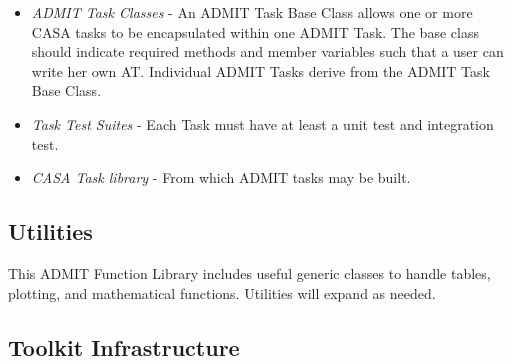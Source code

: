 \documentclass[preprint]{aastex}
\begin{document}
\begin{itemize}
\item {\it ADMIT Task Classes} - An ADMIT Task Base Class allows one or
more CASA tasks to be encapsulated within one ADMIT Task.  The base class
should indicate required methods and member variables such that a user
can write her own AT.  Individual ADMIT Tasks derive from the ADMIT Task
Base Class.


\item {\it Task Test Suites} - Each Task must have at least a unit test and integration test.

\item {\it CASA Task library }  - From which ADMIT tasks may be built.

\end{itemize}

\subsection{Utilities}
This ADMIT Function Library includes useful generic classes to handle
tables, plotting, and mathematical functions. Utilities will expand
as needed.

\subsection{Toolkit Infrastructure}
\end{document}
